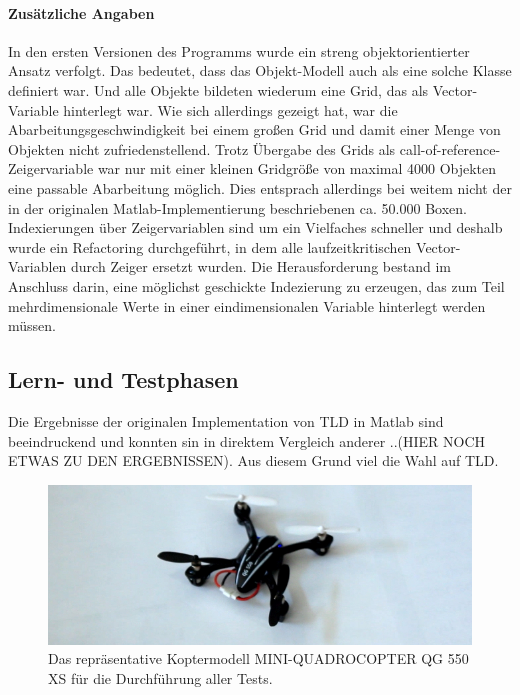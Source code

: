 \paragraph{Zusätzliche Angaben}
In den ersten Versionen des Programms wurde ein streng objektorientierter Ansatz verfolgt. Das bedeutet, dass das Objekt-Modell auch als eine solche Klasse definiert war. Und alle Objekte bildeten wiederum eine Grid, das als Vector-Variable hinterlegt war. Wie sich allerdings gezeigt hat, war die Abarbeitungsgeschwindigkeit bei einem großen Grid und damit einer Menge von Objekten nicht zufriedenstellend. Trotz Übergabe des Grids als call-of-reference-Zeigervariable war nur mit einer kleinen Gridgröße von maximal 4000 Objekten eine passable Abarbeitung möglich. Dies entsprach allerdings bei weitem nicht der in der originalen Matlab-Implementierung beschriebenen ca. 50.000 Boxen. Indexierungen über Zeigervariablen sind um ein Vielfaches schneller und deshalb wurde ein Refactoring durchgeführt, in dem alle laufzeitkritischen Vector-Variablen durch Zeiger ersetzt wurden. Die Herausforderung bestand im Anschluss darin, eine möglichst geschickte Indezierung zu erzeugen, das zum Teil mehrdimensionale Werte in einer eindimensionalen Variable hinterlegt werden müssen.

\subsection{Lern- und Testphasen}
\label{subsection:learning_and_testing}
Die Ergebnisse der originalen Implementation von TLD in Matlab sind beeindruckend und konnten sin in direktem Vergleich anderer ..(HIER NOCH ETWAS ZU DEN ERGEBNISSEN). Aus diesem Grund viel die Wahl auf TLD.

\begin{figure}[H]
	\begin{centering}
		\includegraphics[scale=0.6]{../pictures/kopter}
		\caption{Das repräsentative Koptermodell MINI-QUADROCOPTER QG 550 XS für die Durchführung aller Tests.}
		\label{abb:kopter}
		\par
	\end{centering}
\end{figure}

